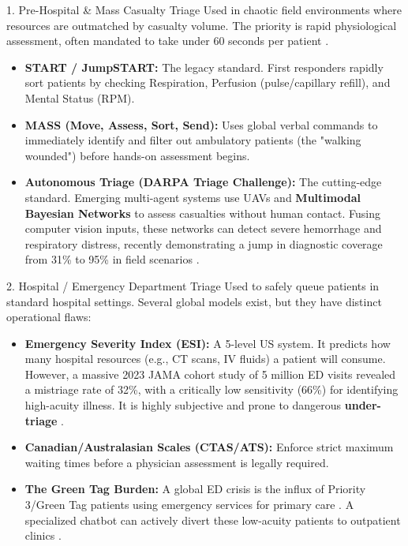 \documentclass[aspectratio=169]{beamer}
\begin{document}
	\begin{frame}{1. Pre-Hospital \& Mass Casualty Triage}
		Used in chaotic field environments where resources are outmatched by casualty volume. The priority is rapid physiological assessment, often mandated to take under 60 seconds per patient \cite{Rusiecki2025}.
		\vspace{0.2cm}
		\begin{itemize}
			\item \textbf{START / JumpSTART:} The legacy standard. First responders rapidly sort patients by checking Respiration, Perfusion (pulse/capillary refill), and Mental Status (RPM).
			\item \textbf{MASS (Move, Assess, Sort, Send):} Uses global verbal commands to immediately identify and filter out ambulatory patients (the "walking wounded") before hands-on assessment begins.
			\item \textbf{Autonomous Triage (DARPA Triage Challenge):} The cutting-edge standard. Emerging multi-agent systems use UAVs and \textbf{Multimodal Bayesian Networks} to assess casualties without human contact. Fusing computer vision inputs, these networks can detect severe hemorrhage and respiratory distress, recently demonstrating a jump in diagnostic coverage from 31\% to 95\% in field scenarios \cite{Rusiecki2025}.
		\end{itemize}
	\end{frame}
	
	\begin{frame}{2. Hospital / Emergency Department Triage}
		Used to safely queue patients in standard hospital settings. Several global models exist, but they have distinct operational flaws:
		\vspace{0.2cm}
		\begin{itemize}
			\item \textbf{Emergency Severity Index (ESI):} A 5-level US system. It predicts how many hospital resources (e.g., CT scans, IV fluids) a patient will consume. However, a massive 2023 JAMA cohort study of 5 million ED visits revealed a mistriage rate of 32\%, with a critically low sensitivity (66\%) for identifying high-acuity illness. It is highly subjective and prone to dangerous \textbf{under-triage} \cite{Berkowitz2019}.
			\item \textbf{Canadian/Australasian Scales (CTAS/ATS):} Enforce strict maximum waiting times before a physician assessment is legally required.
			\item \textbf{The Green Tag Burden:} A global ED crisis is the influx of Priority 3/Green Tag patients using emergency services for primary care \cite{Yilmaz2021}. A specialized chatbot can actively divert these low-acuity patients to outpatient clinics \cite{Sundstrom2014}.
		\end{itemize}
	\end{frame}
	
\end{document}
